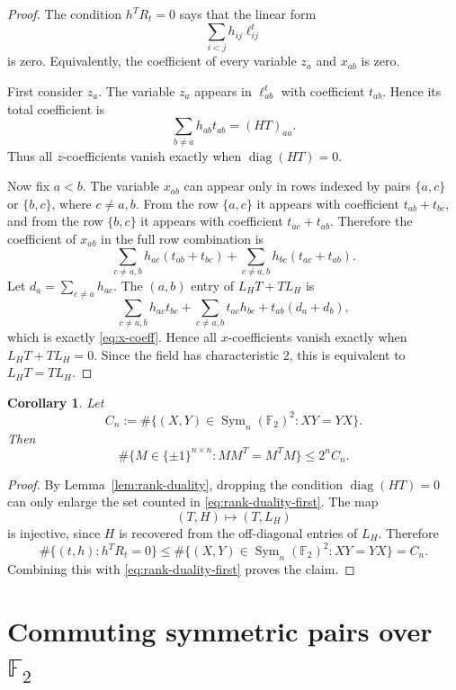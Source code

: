 \documentclass[11pt]{amsart}
\newtheorem{corollary}[theorem]{Corollary}
\theoremstyle{remark}
\numberwithin{equation}{section}
\newcommand{\F}{\mathbb F}
\newcommand{\Sym}{\operatorname{Sym}}
\newcommand{\diag}{\operatorname{diag}}
\begin{document}
\begin{proof}
The condition $h^TR_t=0$ says that the linear form
\[
        \sum_{i<j}h_{ij}\ell^t_{ij}
\]
is zero.  Equivalently, the coefficient of every variable $z_a$ and $x_{ab}$ is zero.

First consider $z_a$.  The variable $z_a$ appears in $\ell^t_{ab}$ with coefficient $t_{ab}$.  Hence its total coefficient is
\[
        \sum_{b\ne a}h_{ab}t_{ab}=(HT)_{aa}.
\]
Thus all $z$-coefficients vanish exactly when $\diag(HT)=0$.

Now fix $a<b$.  The variable $x_{ab}$ can appear only in rows indexed by pairs $\{a,c\}$ or $\{b,c\}$, where $c\ne a,b$.  From the row $\{a,c\}$ it appears with coefficient $t_{ab}+t_{bc}$, and from the row $\{b,c\}$ it appears with coefficient $t_{ac}+t_{ab}$.  Therefore the coefficient of $x_{ab}$ in the full row combination is
\begin{equation}\label{eq:x-coeff}
        \sum_{c\ne a,b}h_{ac}(t_{ab}+t_{bc})
        +\sum_{c\ne a,b}h_{bc}(t_{ac}+t_{ab}).
\end{equation}
Let $d_a=\sum_{c\ne a}h_{ac}$.  The $(a,b)$ entry of $L_HT+TL_H$ is
\[
        \sum_{c\ne a,b}h_{ac}t_{bc}+\sum_{c\ne a,b}t_{ac}h_{bc}+t_{ab}(d_a+d_b),
\]
which is exactly \eqref{eq:x-coeff}.  Hence all $x$-coefficients vanish exactly when $L_HT+TL_H=0$.  Since the field has characteristic $2$, this is equivalent to $L_HT=TL_H$.
\end{proof}

\begin{corollary}\label{cor:commuting-pairs-reduction}
Let
\[
        C_n:=\#\{(X,Y)\in\Sym_n(\F_2)^2:XY=YX\}.
\]
Then
\[
        \#\{M\in\{\pm1\}^{n\times n}:MM^T=M^TM\}\leq 2^n C_n.
\]
\end{corollary}

\begin{proof}
By Lemma~\ref{lem:rank-duality}, dropping the condition $\diag(HT)=0$ can only enlarge the set counted in \eqref{eq:rank-duality-first}.  The map
\[
        (T,H)\longmapsto (T,L_H)
\]
is injective, since $H$ is recovered from the off-diagonal entries of $L_H$.  Therefore
\[
        \#\{(t,h):h^TR_t=0\}
        \leq \#\{(X,Y)\in\Sym_n(\F_2)^2:XY=YX\}=C_n.
\]
Combining this with \eqref{eq:rank-duality-first} proves the claim.
\end{proof}


\section{Commuting symmetric pairs over $\F_2$}\label{sec:commuting-pairs}
\end{document}
